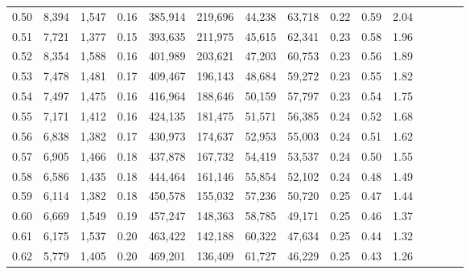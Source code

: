 \begin{tabular}{rrrcrrrrrrrrrrr}
0.50 &   8,394 &  1,547 &                                       0.16 &  385,914 &  219,696 &   44,238 &   63,718 &  0.22 &  0.59 &                         2.04 \\
0.51 &   7,721 &  1,377 &                                       0.15 &  393,635 &  211,975 &   45,615 &   62,341 &  0.23 &  0.58 &                         1.96 \\
0.52 &   8,354 &  1,588 &                                       0.16 &  401,989 &  203,621 &   47,203 &   60,753 &  0.23 &  0.56 &                         1.89 \\
0.53 &   7,478 &  1,481 &                                       0.17 &  409,467 &  196,143 &   48,684 &   59,272 &  0.23 &  0.55 &                         1.82 \\
0.54 &   7,497 &  1,475 &                                       0.16 &  416,964 &  188,646 &   50,159 &   57,797 &  0.23 &  0.54 &                         1.75 \\
0.55 &   7,171 &  1,412 &                                       0.16 &  424,135 &  181,475 &   51,571 &   56,385 &  0.24 &  0.52 &                         1.68 \\
0.56 &   6,838 &  1,382 &                                       0.17 &  430,973 &  174,637 &   52,953 &   55,003 &  0.24 &  0.51 &                         1.62 \\
0.57 &   6,905 &  1,466 &                                       0.18 &  437,878 &  167,732 &   54,419 &   53,537 &  0.24 &  0.50 &                         1.55 \\
0.58 &   6,586 &  1,435 &                                       0.18 &  444,464 &  161,146 &   55,854 &   52,102 &  0.24 &  0.48 &                         1.49 \\
0.59 &   6,114 &  1,382 &                                       0.18 &  450,578 &  155,032 &   57,236 &   50,720 &  0.25 &  0.47 &                         1.44 \\
0.60 &   6,669 &  1,549 &                                       0.19 &  457,247 &  148,363 &   58,785 &   49,171 &  0.25 &  0.46 &                         1.37 \\
0.61 &   6,175 &  1,537 &                                       0.20 &  463,422 &  142,188 &   60,322 &   47,634 &  0.25 &  0.44 &                         1.32 \\
0.62 &   5,779 &  1,405 &                                       0.20 &  469,201 &  136,409 &   61,727 &   46,229 &  0.25 &  0.43 &                         1.26 \\

\end{tabular}
